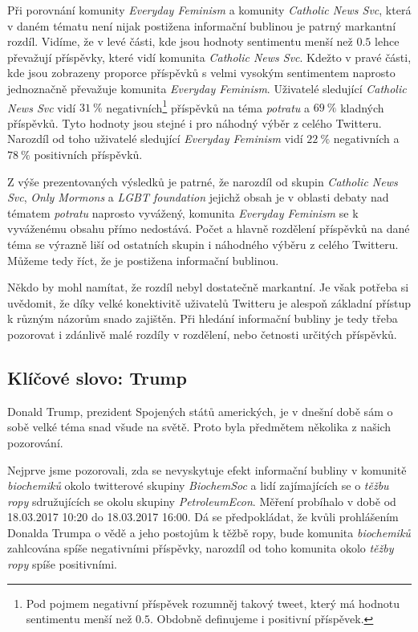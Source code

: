 \documentclass[12pt, a4paper]{article}
\numberwithin{equation}{section} 	%
\begin{document}
Při porovnání komunity \textit{Everyday Feminism} a komunity \textit{Catholic News Svc}, která v daném tématu není nijak postižena informační bublinou je patrný markantní rozdíl. Vidíme, že v levé části, kde jsou hodnoty sentimentu menší než $0.5$ lehce převažují příspěvky, které vidí komunita \textit{Catholic News Svc}. Kdežto v pravé části, kde jsou zobrazeny proporce příspěvků s velmi vysokým sentimentem naprosto jednoznačně převažuje komunita \textit{Everyday Feminism}. Uživatelé sledující \textit{Catholic News Svc} vidí $31~\%$ negativních\footnote{Pod pojmem negativní příspěvek rozumněj takový tweet, který má hodnotu sentimentu menší než $0.5$. Obdobně definujeme i positivní příspěvek.} příspěvků na téma \textit{potratu} a $69~\%$ kladných příspěvků. Tyto hodnoty jsou stejné i pro náhodný výběr z celého Twitteru. Narozdíl od toho uživatelé sledující \textit{Everyday Feminism} vidí $22~\%$ negativních a $78~\%$ positivních příspěvků.

Z výše prezentovaných výsledků je patrné, že narozdíl od skupin \textit{Catholic News Svc}, \textit{Only Mormons} a \textit{LGBT foundation} jejichž obsah je v oblasti debaty nad tématem \textit{potratu} naprosto vyvážený, komunita \textit{Everyday Feminism} se k vyváženému obsahu přímo nedostává. Počet a hlavně rozdělení příspěvků na dané téma se výrazně liší od ostatních skupin i náhodného výběru z celého Twitteru. Můžeme tedy říct, že je postižena informační bublinou.

Někdo by mohl namítat, že rozdíl nebyl dostatečně markantní. Je však potřeba si uvědomit, že díky velké konektivitě uživatelů Twitteru je alespoň základní přístup k různým názorům snado zajištěn. Při hledání informační bubliny je tedy třeba pozorovat i zdánlivě malé rozdíly v rozdělení, nebo četnosti určitých příspěvků.

\subsection{Klíčové slovo: Trump}\label{subsec:Trump}
\noindent Donald Trump, prezident Spojených států amerických, je v dnešní době sám o sobě velké téma snad všude na světě. Proto byla předmětem několika z našich pozorování.

Nejprve jsme pozorovali, zda se nevyskytuje efekt informační bubliny v komunitě \textit{biochemiků} okolo twitterové skupiny \textit{BiochemSoc} a lidí zajímajících se o \textit{těžbu ropy} sdružujících se okolu skupiny \textit{PetroleumEcon}. Měření probíhalo v době od 18.03.2017 10:20 do 18.03.2017 16:00. Dá se předpokládat, že kvůli prohlášením Donalda Trumpa o vědě a jeho postojům k těžbě ropy, bude komunita \textit{biochemiků} zahlcována spíše negativními příspěvky, narozdíl od toho komunita okolo \textit{těžby ropy} spíše positivními.
\end{document}
